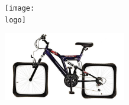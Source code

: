 \renewcommand{\date}{}

\begin{titlepage}

\begin{center}
    \texttt{[image: \\logo]}
\end{center}


\begin{spacing}{3}
    \thickrule
    \begin{flushright}
        \includegraphics[width=0.4\textwidth]{../images/bicycle.jpg}
        \vskip 5mm
        \begin{minipage}{\textwidth}
            \begin{flushright}
                \textbf{\Huge\title{}}
            \end{flushright}
        \end{minipage}
    \end{flushright}
    \thickrule
\end{spacing}


\begin{center}
    \texttt{\small\date{}}
\end{center}


\end{titlepage}

